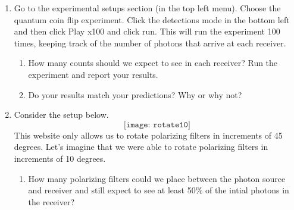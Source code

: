 \documentclass[12pt]{article}
\begin{document}
\begin{enumerate}[font=\bfseries]
    \item Go to the experimental setups section (in the top left menu). Choose the quantum coin flip experiment. Click the detections mode in the bottom left and then click Play x100 and click run. This will run the experiment 100 times, keeping track of the number of photons that arrive at each receiver. 
    \begin{enumerate}
        \item How many counts should we expect to see in each receiver? Run the experiment and report your results.
        \item Do your results match your predictions? Why or why not?
    \end{enumerate}
    \item Consider the setup below.
    \[\texttt{[image: rotate10]}\]
    This website only allows us to rotate polarizing filters in increments of 45 degrees. Let's imagine that we were able to rotate polarizing filters in increments of 10 degrees.
    \begin{enumerate}
        \item How many polarizing filters could we place between the photon source and receiver and still expect to see at least 50\% of the intial photons in the receiver?
    \end{enumerate}
\end{enumerate}
\end{document}
